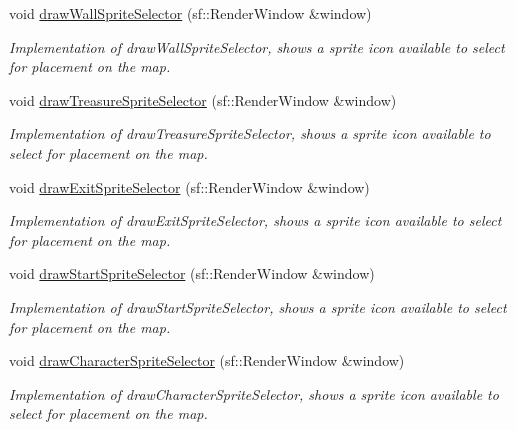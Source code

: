 \begin{DoxyCompactItemize}
\hypertarget{classUi_a6199e2762fa51b2ad2794e3e4b75d9f1}{}\label{classUi_a6199e2762fa51b2ad2794e3e4b75d9f1} 
void \hyperlink{classUi_a6199e2762fa51b2ad2794e3e4b75d9f1}{draw\+Wall\+Sprite\+Selector} (sf\+::\+Render\+Window \&window)
\begin{DoxyCompactList}\small\item\em Implementation of draw\+Wall\+Sprite\+Selector, shows a sprite icon available to select for placement on the map. \end{DoxyCompactList}\item 
\hypertarget{classUi_a9fc40bf2227fa70c24f84d230954723a}{}\label{classUi_a9fc40bf2227fa70c24f84d230954723a} 
void \hyperlink{classUi_a9fc40bf2227fa70c24f84d230954723a}{draw\+Treasure\+Sprite\+Selector} (sf\+::\+Render\+Window \&window)
\begin{DoxyCompactList}\small\item\em Implementation of draw\+Treasure\+Sprite\+Selector, shows a sprite icon available to select for placement on the map. \end{DoxyCompactList}\item 
\hypertarget{classUi_ad24199bce1a6b2726ddcbc293d5d9706}{}\label{classUi_ad24199bce1a6b2726ddcbc293d5d9706} 
void \hyperlink{classUi_ad24199bce1a6b2726ddcbc293d5d9706}{draw\+Exit\+Sprite\+Selector} (sf\+::\+Render\+Window \&window)
\begin{DoxyCompactList}\small\item\em Implementation of draw\+Exit\+Sprite\+Selector, shows a sprite icon available to select for placement on the map. \end{DoxyCompactList}\item 
\hypertarget{classUi_a189bc10a3d0c045187d043fb35fd09e4}{}\label{classUi_a189bc10a3d0c045187d043fb35fd09e4} 
void \hyperlink{classUi_a189bc10a3d0c045187d043fb35fd09e4}{draw\+Start\+Sprite\+Selector} (sf\+::\+Render\+Window \&window)
\begin{DoxyCompactList}\small\item\em Implementation of draw\+Start\+Sprite\+Selector, shows a sprite icon available to select for placement on the map. \end{DoxyCompactList}\item 
\hypertarget{classUi_abe7973636985cecd03845dfbb6caf3a5}{}\label{classUi_abe7973636985cecd03845dfbb6caf3a5} 
void \hyperlink{classUi_abe7973636985cecd03845dfbb6caf3a5}{draw\+Character\+Sprite\+Selector} (sf\+::\+Render\+Window \&window)
\begin{DoxyCompactList}\small\item\em Implementation of draw\+Character\+Sprite\+Selector, shows a sprite icon available to select for placement on the map. \end{DoxyCompactList}\item 

\end{DoxyCompactItemize}
